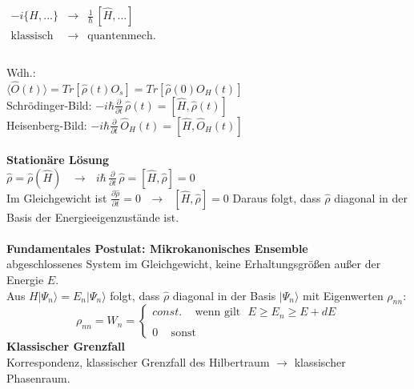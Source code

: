 \documentclass[a4paper,11pt]{scrartcl}
\begin{document}
$\begin{array}{rrr}
  - i \{ H, ... \} & \longrightarrow & \frac{1}{\hbar} \, \left[ \hat{H},...\right] \\
  \mathrm{klassisch} & \longrightarrow & \mathrm{quantenmech.}\\                                                                                   
 \end{array}$\\
 \\
 Wdh.:\\
 $ \langle \hat{O}(t) \rangle = Tr\left[\hat{\rho}(t) O_s \right] = Tr\left[\hat{\rho}(0) O_H(t) \right]$\\
 Schrödinger-Bild: $ -i \hbar \frac{\partial}{\partial t} \, \hat{\rho}(t) = \left[ \hat{H}, \hat{\rho}(t) \right]$\\
 Heisenberg-Bild: $ -i \hbar \frac{\partial}{\partial t} \, \hat{O}_H(t) = \left[ \hat{H}, \hat{O}_H(t) \right]$\\
 \\
 \textbf{Stationäre Lösung}\\
 $\hat{\rho} = \hat{\rho}(\hat{H}) \,\,\,\,\, \rightarrow \,\,\,\, i \hbar \, \frac{\partial }{\partial t} \, \hat{\rho} = \left[ \hat{H}, \hat{\rho} \right] = 0$
\\
Im Gleichgewicht ist $\frac{\partial \hat{\rho}}{ \partial t} = 0 \,\,\,\, \rightarrow \,\,\,\, \left[ \hat{H}, \hat{\rho} \right] = 0$ Daraus folgt, dass $\hat{\rho} $ diagonal in der Basis der Energieeigenzustände ist.\\
\\
\textbf{Fundamentales Postulat: Mikrokanonisches Ensemble}\\
abgeschlossenes System im Gleichgewicht, keine Erhaltungsgrößen außer der Energie $E$.\\
Aus $H | \Psi_n \rangle = E_n | \Psi_n \rangle$ folgt, dass $\hat{\rho}$ diagonal in der Basis $|\Psi_n \rangle $ mit Eigenwerten $\rho_{nn}$:
\begin{equation}
  \rho_{nn} = W_n = \left\{ \begin{array}{c} const. \,\,\,\,\,\,\, \mathrm{wenn} \,\, \mathrm{gilt}\,\,\,\,  E \geq E_n \geq E+dE \\ \\ 0\,\,\,\,\,\,\, \mathrm{sonst}  \end{array} \right.
\end{equation}
\textbf{Klassischer Grenzfall}\\
Korrespondenz, klassischer Grenzfall des Hilbertraum $\rightarrow$ klassischer Phasenraum.\\
\end{document}
